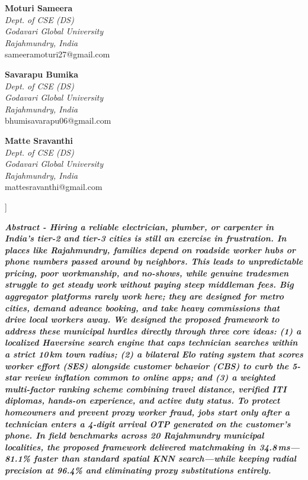 \documentclass[10pt,twocolumn,a4paper]{article}
\begin{document}
{\begin{center}
    \begin{minipage}[t]{0.31\textwidth}
      \centering
      \textbf{Moturi Sameera}\\
      \textit{Dept. of CSE (DS)}\\
      \textit{Godavari Global University}\\
      \textit{Rajahmundry, India}\\
      sameeramoturi27@gmail.com
    \end{minipage}
    \hfill
    \begin{minipage}[t]{0.31\textwidth}
      \centering
      \textbf{Savarapu Bumika}\\
      \textit{Dept. of CSE (DS)}\\
      \textit{Godavari Global University}\\
      \textit{Rajahmundry, India}\\
      bhumisavarapu06@gmail.com
    \end{minipage}
    \hfill
    \begin{minipage}[t]{0.31\textwidth}
      \centering
      \textbf{Matte Sravanthi}\\
      \textit{Dept. of CSE (DS)}\\
      \textit{Godavari Global University}\\
      \textit{Rajahmundry, India}\\
      mattesravanthi@gmail.com
    \end{minipage}
    \vspace{1.8em}
  \end{center}
}]

\noindent
\textbf{\textit{Abstract - Hiring a reliable electrician, plumber, or carpenter in India's tier-2 and tier-3 cities is still an exercise in frustration. In places like Rajahmundry, families depend on roadside worker hubs or phone numbers passed around by neighbors. This leads to unpredictable pricing, poor workmanship, and no-shows, while genuine tradesmen struggle to get steady work without paying steep middleman fees. Big aggregator platforms rarely work here; they are designed for metro cities, demand advance booking, and take heavy commissions that drive local workers away. We designed the proposed framework to address these municipal hurdles directly through three core ideas: (1) a localized Haversine search engine that caps technician searches within a strict 10\,km town radius; (2) a bilateral Elo rating system that scores worker effort (SES) alongside customer behavior (CBS) to curb the 5-star review inflation common to online apps; and (3) a weighted multi-factor ranking scheme combining travel distance, verified ITI diplomas, hands-on experience, and active duty status. To protect homeowners and prevent proxy worker fraud, jobs start only after a technician enters a 4-digit arrival OTP generated on the customer's phone. In field benchmarks across 20 Rajahmundry municipal localities, the proposed framework delivered matchmaking in 34.8\,ms---81.1\% faster than standard spatial KNN search---while keeping radial precision at 96.4\% and eliminating proxy substitutions entirely.}}
\end{document}
